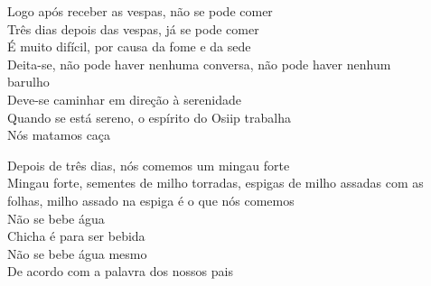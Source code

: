  \smallskip
 \begin{center}\end{center}
 \smallskip
 
\noindent Logo após receber as vespas, não se pode comer\\
 Três dias depois das vespas, já se pode comer\\
 É muito difícil, por causa da fome e da sede\\
 Deita-se, não pode haver nenhuma conversa, não pode haver nenhum\\
 barulho\\
 Deve-se caminhar em direção à serenidade\\
 Quando se está sereno, o espírito do Osiip trabalha\\
 Nós matamos caça
 
 \smallskip
 \begin{center}\end{center}
 \smallskip
 
\noindent Depois de três dias, nós comemos um mingau forte\\
 Mingau forte, sementes de milho torradas, espigas de milho assadas com as folhas, milho assado na espiga é o que nós comemos\\
 Não se bebe água\\
 Chicha é para ser bebida\\
 Não se bebe água mesmo\\
 De acordo com a palavra dos nossos pais
 
